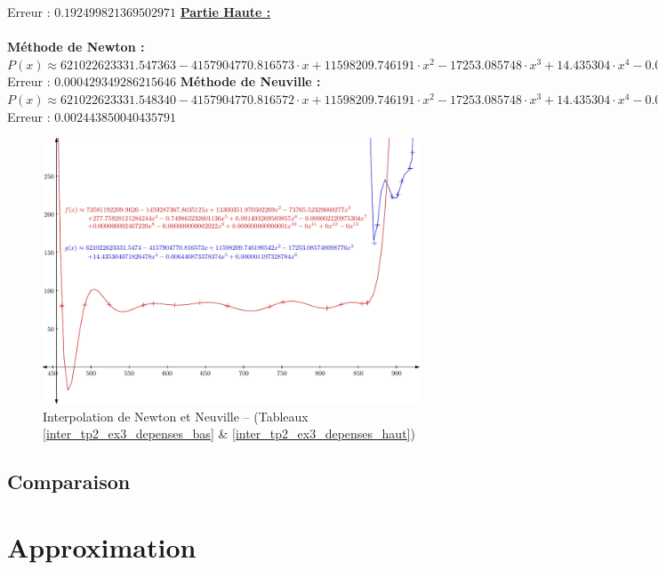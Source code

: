\documentclass{report}
\begin{document}
	Erreur : $0.192499821369502971$
	\newline
	\newline
	\newline
	\underline{\textbf{Partie Haute :}} \\ \\
	\textbf{Méthode de Newton :}\\
	$P(x) \approx 621022623331.547363-4157904770.816573 \cdot x + 11598209.746191 \cdot x^{2} - 17253.085748 \cdot x^{3}  + 14.435304 \cdot x^{4} - 0.006441 \cdot x^{5}  + 0.000001 \cdot x^{6} $\\
	Erreur : $0.000429349286215646$
	\newline
	\newline
	\textbf{Méthode de Neuville :}\\
	$P(x) \approx 621022623331.548340-4157904770.816572 \cdot x + 11598209.746191 \cdot x^{2} - 17253.085748 \cdot x^{3}  + 14.435304 \cdot x^{4} - 0.006441 \cdot x^{5}  + 0.000001 \cdot x^{6} $\\
	Erreur : $0.002443850040435791$
      \newpage
      \begin{figure}[h]
	\centering
	\includegraphics[scale=0.85]{graphiques/pdf_output/inter_tp2_ex3.pdf}
	\caption{Interpolation de Newton et Neuville -- (Tableaux \ref{inter_tp2_ex3_depenses_bas} \& \ref{inter_tp2_ex3_depenses_haut})}
      \end{figure}
    \newpage
    \section{Comparaison}
  \chapter{Approximation}
\end{document}
